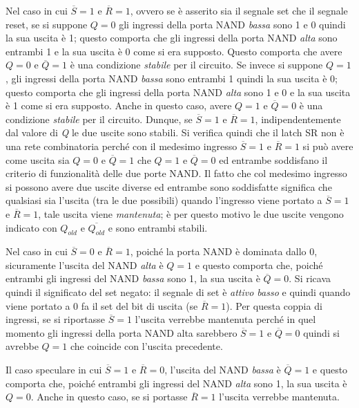 \documentclass[12pt, a4paper]{report}
\begin{document}
Nel caso in cui $\overline{S} = 1$ e $\overline{R} = 1$, ovvero se è asserito sia il segnale set che il segnale reset, se si suppone $Q = 0$ gli ingressi della porta NAND \textit{bassa} sono 1 e 0 quindi la sua uscita è 1; questo comporta che gli ingressi della porta NAND \textit{alta} sono entrambi 1 e la sua uscita è 0 come si era supposto. Questo comporta che avere $Q = 0$ e $\overline{Q} = 1$ è una condizione \textit{stabile} per il circuito. Se invece si suppone $Q = 1$, gli ingressi della porta NAND \textit{bassa} sono entrambi 1 quindi la sua uscita è 0; questo comporta che gli ingressi della porta NAND \textit{alta} sono 1 e 0 e la sua uscita è 1 come si era supposto. Anche in questo caso, avere $Q = 1$ e $\overline{Q} = 0$ è una condizione \textit{stabile} per il circuito. Dunque, se $\overline{S} = 1$ e $\overline{R} = 1$, indipendentemente dal valore di \textit{Q} le due uscite sono stabili. Si verifica quindi che il latch SR non è una rete combinatoria perché con il medesimo ingresso $\overline{S} = 1$ e $\overline{R} = 1$ si può avere come uscita sia $Q = 0$ e $\overline{Q} = 1$ che $Q = 1$ e $\overline{Q} = 0$ ed entrambe soddisfano il criterio di funzionalità delle due porte NAND. Il fatto che col medesimo ingresso si possono avere due uscite diverse ed entrambe sono soddisfatte significa che qualsiasi sia l'uscita (tra le due possibili) quando l'ingresso viene portato a $\overline{S} = 1$ e $\overline{R} = 1$, tale uscita viene \textit{mantenuta}; è per questo motivo le due uscite vengono indicato con  $Q_{old}$ e $\overline{Q_{old}}$ e sono entrambi stabili.

Nel caso in cui $\overline{S} = 0$ e $\overline{R} = 1$, poiché la porta NAND è dominata dallo 0, sicuramente l'uscita del NAND \textit{alta} è $Q = 1$ e questo comporta che, poiché entrambi gli ingressi del NAND \textit{bassa} sono 1, la sua uscita è $\overline{Q} = 0$. Si ricava quindi il significato del set negato: il segnale di set è \textit{attivo basso} e quindi quando viene portato a 0 fa il set del bit di uscita (se $\overline{R} = 1$). Per questa coppia di ingressi, se si riportasse $\overline{S} = 1$ l'uscita verrebbe mantenuta perché in quel momento gli ingressi della porta NAND alta sarebbero $\overline{S} = 1$ e $\overline{Q} = 0$ quindi si avrebbe $Q = 1$ che coincide con l'uscita precedente.

Il caso speculare in cui $\overline{S} = 1$ e $\overline{R} = 0$, l'uscita del NAND \textit{bassa} è $\overline{Q} = 1$ e questo comporta che, poiché entrambi gli ingressi del NAND \textit{alta} sono 1, la sua uscita è $Q = 0$. Anche in questo caso, se si portasse $\overline{R} = 1$ l'uscita verrebbe mantenuta.
\end{document}
